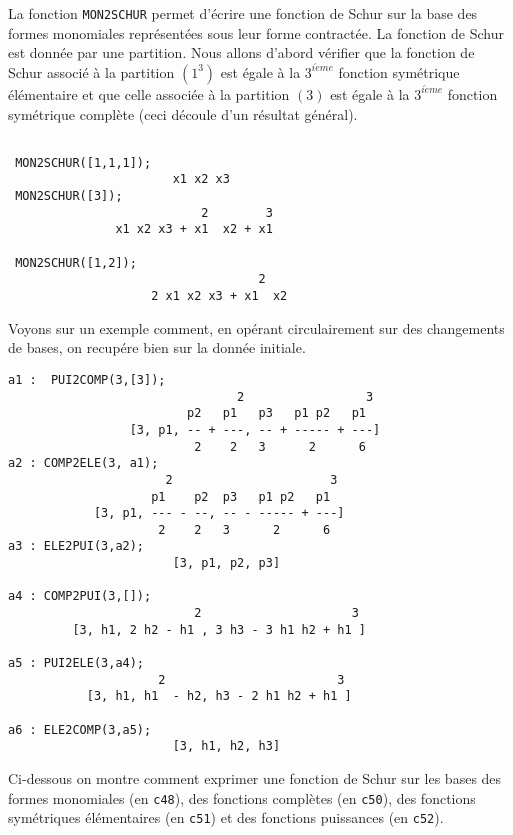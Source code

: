 \documentclass[11pt]{article}
\begin{document}
La fonction {\tt MON2SCHUR} permet d'\'ecrire une fonction
de Schur sur la base des formes monomiales 
repr\'esent\'ees sous leur forme contract\'ee. La fonction de Schur
est donn\'ee par une partition. Nous allons d'abord 
v\'erifier que la fonction de Schur associ\'e \`a la
partition $(1^3)$ est \'egale \`a la $3^{i\grave{e}me}$
fonction sym\'etrique \'el\'ementaire et que celle associ\'ee
\`a la partition $(3)$ est \'egale \`a la $3^{i\grave{e}me}$ fonction
sym\'etrique compl\`ete (ceci d\'ecoule d'un r\'esultat g\'en\'eral).
\small
\begin{verbatim}

 MON2SCHUR([1,1,1]);
                       x1 x2 x3
 MON2SCHUR([3]);
                           2        3
               x1 x2 x3 + x1  x2 + x1

 MON2SCHUR([1,2]);
                                   2
                    2 x1 x2 x3 + x1  x2
\end{verbatim}
\normalsize
Voyons sur un exemple comment, en op\'erant circulairement sur des changements
de bases, on recup\'ere bien sur la donn\'ee initiale.
\small
\begin{verbatim}
a1 :  PUI2COMP(3,[3]);
                                2                 3
                         p2   p1   p3   p1 p2   p1
                 [3, p1, -- + ---, -- + ----- + ---]
                          2    2   3      2      6
a2 : COMP2ELE(3, a1);
                      2                      3
                    p1    p2  p3   p1 p2   p1
            [3, p1, --- - --, -- - ----- + ---]
                     2    2   3      2      6
a3 : ELE2PUI(3,a2);
                       [3, p1, p2, p3]

a4 : COMP2PUI(3,[]);
                          2                     3
         [3, h1, 2 h2 - h1 , 3 h3 - 3 h1 h2 + h1 ]

a5 : PUI2ELE(3,a4);
                     2                        3
           [3, h1, h1  - h2, h3 - 2 h1 h2 + h1 ]

a6 : ELE2COMP(3,a5);
                       [3, h1, h2, h3]
\end{verbatim}
\normalsize
Ci-dessous on montre comment exprimer une fonction de Schur sur les
bases des formes monomiales (en {\tt c48}), des fonctions compl\`etes
(en {\tt c50}), des fonctions sym\'etriques \'el\'ementaires (en {\tt c51})
et des fonctions puissances (en {\tt c52}).
\small
\end{document}
